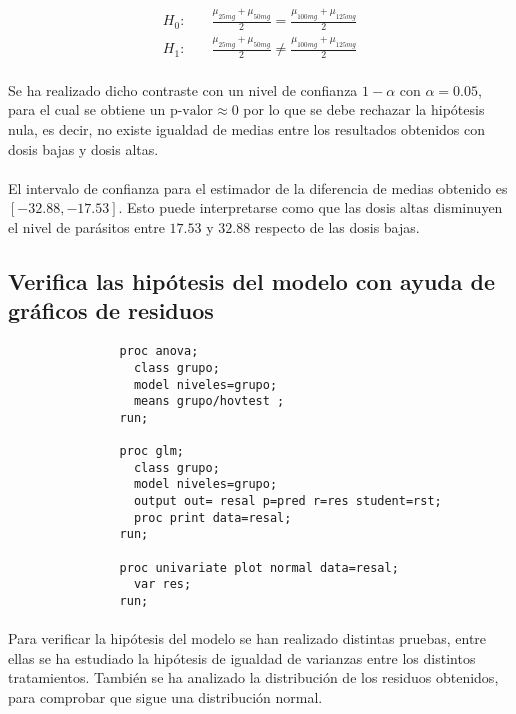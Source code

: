 \documentclass{article}
\begin{document}
      \begin{align*}
        H_0:& \quad \frac{\mu_{25mg} + \mu_{50mg}}{2} = \frac{\mu_{100mg} +\mu_{125mg}}{2} \\
        H_1:& \quad \frac{\mu_{25mg} + \mu_{50mg}}{2} \neq \frac{\mu_{100mg} +\mu_{125mg}}{2}
      \end{align*}

      \paragraph{}
      Se ha realizado dicho contraste con un nivel de confianza $1-\alpha$ con $\alpha = 0.05 $, para el cual se obtiene un $\text{p-valor}\approx 0$ por lo que se debe rechazar la hipótesis nula, es decir, no existe igualdad de medias entre los resultados obtenidos con dosis bajas y dosis altas.

      \paragraph{}
      El intervalo de confianza para el estimador de la diferencia de medias obtenido es $[-32.88, -17.53]$. Esto puede interpretarse como que las dosis altas disminuyen el nivel de parásitos entre $17.53$ y $32.88$ respecto de las dosis bajas.

    \subsection{Verifica las hipótesis del modelo con ayuda de gráficos de residuos}

      \begin{figure}[h]
        \centering
        \begin{verbatim}
          proc anova;
            class grupo;
            model niveles=grupo;
            means grupo/hovtest ;
          run;

          proc glm;
            class grupo;
            model niveles=grupo;
            output out= resal p=pred r=res student=rst;
            proc print data=resal;
          run;

          proc univariate plot normal data=resal;
            var res;
          run;
        \end{verbatim}
        \label{code:sas_8}
      \end{figure}

      \paragraph{}
      Para verificar la hipótesis del modelo se han realizado distintas pruebas, entre ellas se ha estudiado la hipótesis de igualdad de varianzas entre los distintos tratamientos. También se ha analizado la distribución de los residuos obtenidos, para comprobar que sigue una distribución normal.
\end{document}
